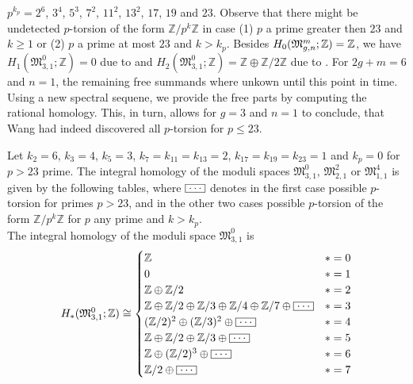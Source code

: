 $p^{k_p} = 2^6$, $3^4$, $5^3$, $7^2$, $11^2$, $13^2$, $17$, $19$ and $23$.
Observe that there might be undetected $p$-torsion of the form $\mathbb Z / p^k \mathbb Z$ in case
(1) $p$ a prime greater then $23$ and $k \ge 1$ or
(2) $p$ a prime at most $23$ and $k > k_p$.
Besides $H_0(\mathfrak{M}^m_{g,n};\mathbb Z) = \mathbb Z$,
we have $H_1(\mathfrak{M}_{3,1}^0;\mathbb Z) = 0$ due to \cite{Powell1978} and $H_2(\mathfrak{M}_{3,1}^0;\mathbb Z) = \mathbb Z \oplus \mathbb Z / 2 \mathbb Z$ due to \cite{Sakasai2012}.
For $2g+m=6$ and $n=1$, the remaining free summands where unkown until this point in time.
Using a new spectral sequene, we provide the free parts by computing the rational homology.
This, in turn, allows for $g=3$ and $n=1$ to conclude, that Wang had indeed discovered all $p$-torsion for $p \le 23$.
\begin{thm*}
    Let $k_2 = 6$, $k_3 = 4$, $k_5 = 3$, $k_7 = k_{11} = k_{13} = 2$, $k_{17} = k_{19} = k_{23} = 1$ and $k_p = 0$ for $p > 23$ prime.
    The integral homology of the moduli spaces $\mathfrak{M}_{3,1}^0$, $\mathfrak{M}_{2,1}^2$ or $\mathfrak{M}_{1,1}^4$ is given by the following tables,
    where $\bldots$ denotes in the first case possible $p$-torsion for primes $p > 23$, 
    and in the other two cases possible $p$-torsion of the form $\mathbb Z / p^k \mathbb Z$ for $p$ any prime and $k > k_p$.
    \\[2pt]
    \noindent The integral homology of the moduli space $\mathfrak{M}_{3,1}^0$ is
    \[
        H_\ast( \mathfrak{M}_{3,1}^0; \mathbb Z ) \cong 
            \begin{cases}
                \mathbb Z           & \ast = 0\\
                0                   & \ast = 1\\
                \mathbb Z \oplus \mathbb Z / 2                                  & \ast = 2\\
                \mathbb Z \oplus \mathbb Z/2 \oplus \mathbb Z/3 \oplus \mathbb Z/4 \oplus \mathbb Z/7 \oplus \bldots & \ast = 3\\
                (\mathbb Z/2)^2 \oplus (\mathbb Z/3)^2  \oplus \bldots          & \ast = 4\\
                \mathbb Z \oplus \mathbb Z/2 \oplus \mathbb Z/3  \oplus \bldots & \ast = 5\\
                \mathbb Z \oplus (\mathbb Z/2)^3  \oplus \bldots                & \ast = 6\\
                \mathbb Z / 2  \oplus \bldots   & \ast = 7\\

\end{cases}\]
\end{thm*}

